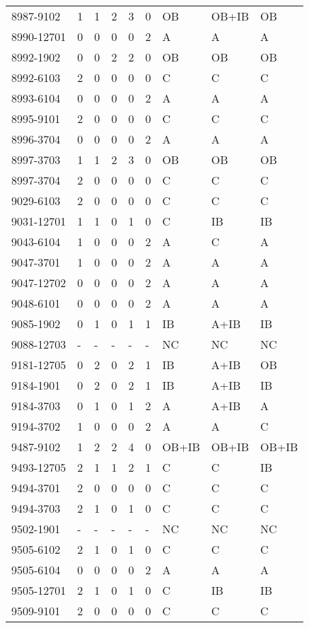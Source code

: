 \begin{longtable}{p{2.1cm}p{0.8cm}p{0.8cm}p{0.8cm}p{0.8cm}p{0.8cm}p{1.5cm}p{1.5cm}p{1.2cm}}
8987-9102 & 1 & 1 & 2 & 3 & 0 & OB & OB+IB & OB \\
8990-12701 & 0 & 0 & 0 & 0 & 2 & A & A & A \\
8992-1902 & 0 & 0 & 2 & 2 & 0 & OB & OB & OB \\
8992-6103 & 2 & 0 & 0 & 0 & 0 & C & C & C \\
8993-6104 & 0 & 0 & 0 & 0 & 2 & A & A & A \\
8995-9101 & 2 & 0 & 0 & 0 & 0 & C & C & C \\
8996-3704 & 0 & 0 & 0 & 0 & 2 & A & A & A \\
8997-3703 & 1 & 1 & 2 & 3 & 0 & OB & OB & OB \\
8997-3704 & 2 & 0 & 0 & 0 & 0 & C & C & C \\
9029-6103 & 2 & 0 & 0 & 0 & 0 & C & C & C \\
9031-12701 & 1 & 1 & 0 & 1 & 0 & C & IB & IB \\
9043-6104 & 1 & 0 & 0 & 0 & 2 & A & C & A \\
9047-3701 & 1 & 0 & 0 & 0 & 2 & A & A & A \\
9047-12702 & 0 & 0 & 0 & 0 & 2 & A & A & A \\
9048-6101 & 0 & 0 & 0 & 0 & 2 & A & A & A \\
9085-1902 & 0 & 1 & 0 & 1 & 1 & IB & A+IB & IB \\
9088-12703 & - & - & - & - & - & NC & NC & NC \\
9181-12705 & 0 & 2 & 0 & 2 & 1 & IB & A+IB & OB \\
9184-1901 & 0 & 2 & 0 & 2 & 1 & IB & A+IB & IB \\
9184-3703 & 0 & 1 & 0 & 1 & 2 & A & A+IB & A \\
9194-3702 & 1 & 0 & 0 & 0 & 2 & A & A & C \\
9487-9102 & 1 & 2 & 2 & 4 & 0 & OB+IB & OB+IB & OB+IB \\
9493-12705 & 2 & 1 & 1 & 2 & 1 & C & C & IB \\
9494-3701 & 2 & 0 & 0 & 0 & 0 & C & C & C \\
9494-3703 & 2 & 1 & 0 & 1 & 0 & C & C & C \\
9502-1901 & - & - & - & - & - & NC & NC & NC \\
9505-6102 & 2 & 1 & 0 & 1 & 0 & C & C & C \\
9505-6104 & 0 & 0 & 0 & 0 & 2 & A & A & A \\
9505-12701 & 2 & 1 & 0 & 1 & 0 & C & IB & IB \\
9509-9101 & 2 & 0 & 0 & 0 & 0 & C & C & C \\

\end{longtable}
